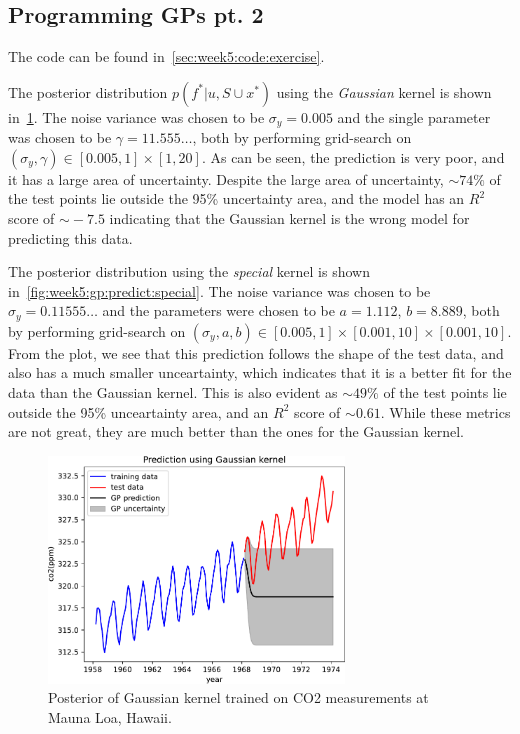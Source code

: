 \subsection{Programming GPs pt. 2}

The code can be found in~\cref{sec:week5:code:exercise}.

The posterior distribution $p(f^\ast | u, S \cup x^\ast)$
using the \emph{Gaussian} kernel is shown in~\cref{fig:week5:gp:predict:gauss}.
The noise variance was chosen to be $\sigma_y = 0.005$
and the single parameter was chosen to be $\gamma = 11.555\ldots$,
both by performing grid-search on
${ (\sigma_y, \gamma) \in [0.005, 1] \times [1, 20] }$.
%
As can be seen, the prediction is very poor,
and it has a large area of uncertainty.
Despite the large area of uncertainty,
$\sim\!74\%$ of the test points lie outside
the 95\% uncertainty area, and the model has an
$R^2$ score of $\sim\!-7.5$ indicating that the Gaussian kernel is the wrong model
for predicting this data.

The posterior distribution
using the \emph{special} kernel is shown in~\cref{fig:week5:gp:predict:special}.
The noise variance was chosen to be $\sigma_y = 0.11555\ldots$
and the parameters were chosen to be $a = 1.112$, $b = 8.889$,
both by performing grid-search on
${ (\sigma_y, a, b) \in [0.005, 1] \times [0.001, 10] \times [0.001, 10] }$.
%
From the plot, we see that this prediction follows the shape of the test data,
and also has a much smaller unceartainty, which indicates that it is a better
fit for the data than the Gaussian kernel.
This is also evident as $\sim\!49\%$ of the test points lie outside the
95\% unceartainty area, and an $R^2$ score of $\sim\!0.61$.
While these metrics are not great, they are much better than
the ones for the Gaussian kernel.

\begin{figure}[htbp]
  \centering
  \includegraphics[width=0.7\textwidth]{./figures/gp_predict_gaussian.pdf}
  \caption{
    Posterior of Gaussian kernel trained on
    CO2 measurements at Mauna Loa, Hawaii.
  }
  \label{fig:week5:gp:predict:gauss}
\end{figure}

